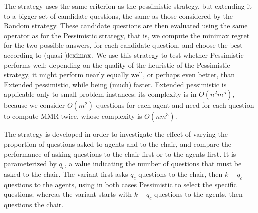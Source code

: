 \documentclass{article}
\begin{document}
The  strategy uses the same criterion as the pessimistic strategy, but extending it to a bigger set of candidate questions, the same as those considered by the Random strategy.
These candidate questions are then evaluated using the same operator as for the Pessimistic strategy, that is, we compute the minimax regret for the two possible answers, for each candidate question, and choose the best according to (quasi-)$\operatorname{leximax}$.
We use this strategy to test whether Pessimistic performs well: depending on the quality of the heuristic of the Pessimistic strategy, it might perform nearly equally well, or perhaps even better, than Extended pessimistic, while being (much) faster. Extended pessimistic is applicable only to small problem instances: its complexity is in $O(n^2 m^5)$, because we consider $O(m^2)$ questions for each agent and need for each question to compute MMR twice, whose complexity is $O(nm^3)$.

The  strategy is developed in order to investigate the effect of varying the proportion of questions asked to agents and to the chair, and compare the performance of asking questions to the chair first or to the agents first. It is parameterized by $q_c$, a value indicating the number of questions that must be asked to the chair.
The  variant first asks $q_c$ questions to the chair, then $k - q_c$ questions to the agents, using in both cases Pessimistic to select the specific questions; whereas the  variant starts with $k - q_c$ questions to the agents, then questions the chair. 
\end{document}
